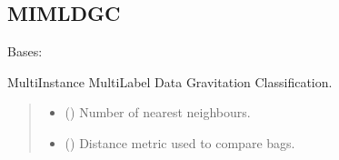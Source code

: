 \documentclass[letterpaper,10pt,english]{sphinxmanual}
\begin{document}
\begin{fulllineitems}
\begin{fulllineitems}
\begin{quote}
\begin{description}
\end{description}\end{quote}

\end{fulllineitems}


\end{fulllineitems}



\subsection{MIML\sphinxhyphen{}DGC}
\label{\detokenize{classifier/lazy/index:miml-dgc}}

\begin{fulllineitems}
\label{\detokenize{classifier/lazy/index:miml.classifier.miml.lazy.miml_dgc.MIMLDGC}}
\pysigstartsignatures
\pysiglinewithargsret
{}
{\sphinxparamcomma {}\sphinxparamcomma {}}
{}
\pysigstopsignatures
\sphinxAtStartPar
Bases: {\hyperref[\detokenize{classifier/lazy/index:miml.classifier.miml.lazy.multi_instance_multi_label_knn.MultiInstanceMultiLabelKNN}]{}}

\sphinxAtStartPar
Multi\sphinxhyphen{}Instance Multi\sphinxhyphen{}Label Data Gravitation Classification.
\begin{quote}\begin{description}
\begin{itemize}
\item {} 
\sphinxAtStartPar
{} (\sphinxstyleliteralemphasis{\sphinxupquote{, }}) \textendash{} Number of nearest neighbours.

\item {} 
\sphinxAtStartPar
{} ({\hyperref[\detokenize{core/index:miml.core.hausdorff_distance.HausdorffDistance}]{}}\sphinxstyleliteralemphasis{\sphinxupquote{, }}) \textendash{} Distance metric used to compare bags.


\end{itemize}
\end{description}
\end{quote}
\end{fulllineitems}
\end{document}
